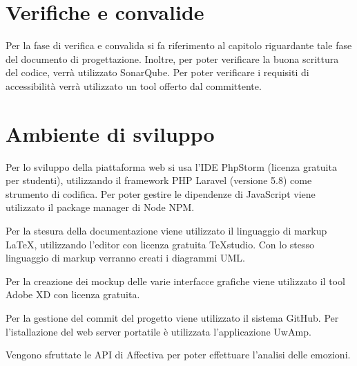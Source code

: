 \section{Verifiche e convalide}
Per la fase di verifica e convalida si fa riferimento al capitolo riguardante 
tale fase del documento di progettazione. Inoltre, per poter verificare la 
buona scrittura del codice, verrà utilizzato SonarQube. Per poter verificare i 
requisiti di accessibilità verrà utilizzato un tool offerto dal committente.

\section{Ambiente di sviluppo}
Per lo sviluppo della piattaforma web si usa l'IDE PhpStorm (licenza gratuita 
per studenti), utilizzando il framework PHP Laravel (versione 5.8) come 
strumento di codifica. Per poter gestire le dipendenze di JavaScript viene 
utilizzato il package manager di Node NPM.

Per la stesura della documentazione viene utilizzato il linguaggio di markup 
LaTeX, utilizzando l'editor con licenza gratuita TeXstudio. Con lo stesso 
linguaggio di markup verranno creati i diagrammi UML.

Per la creazione dei mockup delle varie interfacce grafiche viene utilizzato il 
tool Adobe XD con licenza gratuita. 

Per la gestione del commit del progetto viene utilizzato il sistema GitHub. Per 
l'istallazione del web server portatile è utilizzata l'applicazione UwAmp.

Vengono sfruttate le API di Affectiva per poter effettuare l'analisi delle 
emozioni.
